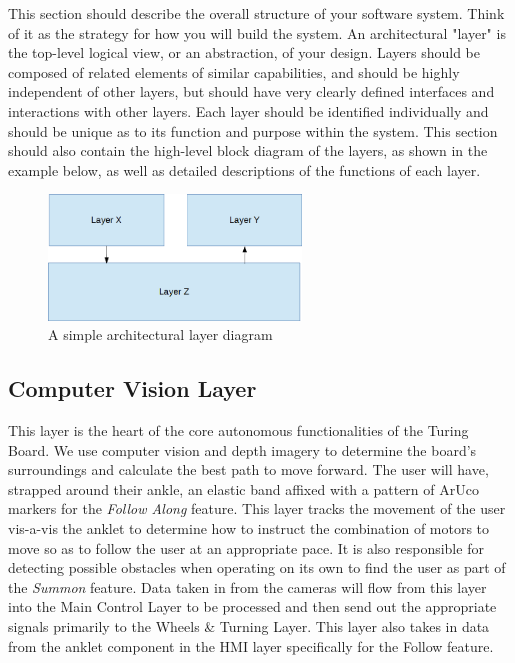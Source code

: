 This section should describe the overall structure of your software system. Think of it as the strategy for how you will build the system. An architectural "layer" is the top-level logical view, or an abstraction, of your design. Layers should be composed of related elements of similar capabilities, and should be highly independent of other layers, but should have very clearly defined interfaces and interactions with other layers. Each layer should be identified individually and should be unique as to its function and purpose within the system. This section should also contain the high-level block diagram of the layers, as shown in the example below, as well as detailed descriptions of the functions of each layer.

\begin{figure}[h!]
	\centering
 	\includegraphics[width=0.60\textwidth]{images/layers}
 \caption{A simple architectural layer diagram}
\end{figure}

\subsection{Computer Vision Layer}
This layer is the heart of the core autonomous functionalities of the Turing Board. We use computer vision and depth imagery to determine the board's surroundings and calculate the best path to move forward. The user will have, strapped around their ankle, an elastic band affixed with a pattern of ArUco markers for the \textit{Follow Along} feature. This layer tracks the movement of the user vis-a-vis the anklet to determine how to instruct the combination of motors to move so as to follow the user at an appropriate pace. It is also responsible for detecting possible obstacles when operating on its own to find the user as part of the \textit{Summon} feature. 
Data taken in from the cameras will flow from this layer into the Main Control Layer to be processed and then send out the appropriate signals primarily to the Wheels \& Turning Layer. This layer also takes in data from the anklet component in the HMI layer specifically for the Follow feature.

